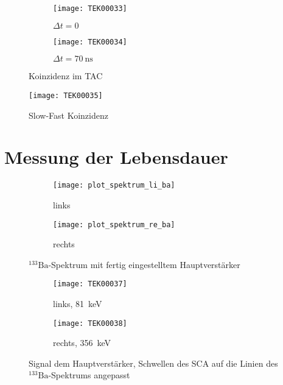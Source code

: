 \documentclass[11pt, ngerman, fleqn, DIV=15, headinclude, BCOR=2cm]{scrreprt}
\begin{document}
\begin{figure}
	\centering
	\begin{subfigure}{0.49 \textwidth}
		\texttt{[image: TEK00033]}
		\caption{%
			$\Delta t = 0$
		}
		\label{fig:fast_signal_tac_koinzidenz-t0}
	\end{subfigure}
	\begin{subfigure}{0.49 \textwidth}
		\texttt{[image: TEK00034]}
		\caption{%
			$\Delta t = \SI{70}{\nano\second}$
		}
		\label{fig:fast_signal_tac_koinzidenz-t5-16}
	\end{subfigure}
	\caption{%
		Koinzidenz im TAC
	}
	\label{fig:fast_signal_tac_koinzidenz}
\end{figure}

\begin{figure}
	\centering
	\texttt{[image: TEK00035]}
	\caption{%
		Slow-Fast Koinzidenz
	}
	\label{fig:slow_fast_koinzidenz}
\end{figure}

\fehlt%

\clearpage

\section{Messung der Lebensdauer}

\begin{figure}
	\centering
	\begin{subfigure}{0.49 \textwidth}
		\texttt{[image: plot\_spektrum\_li\_ba]}
		\caption{%
			links
		}
		\label{fig:ba_slow_hv_eingestellt-li_plot}
	\end{subfigure}
	\begin{subfigure}{0.49 \textwidth}
		\texttt{[image: plot\_spektrum\_re\_ba]}
		\caption{%
			rechts
		}
		\label{fig:ba_slow_hv_eingestellt-re_plot}
	\end{subfigure}
	\caption{%
		$^{133}\text{Ba}$-Spektrum mit fertig eingestelltem
		Hauptverstärker
	}
	\label{fig:ba_slow_signal_hv_eingestellt_plot}
\end{figure}

\begin{figure}
	\centering
	\begin{subfigure}{0.49 \textwidth}
		\texttt{[image: TEK00037]}
		\caption{%
			links, \SI{81}{\kilo\electronvolt}
		}
		\label{fig:ba_slow_signal_sca_eingestellt-li}
	\end{subfigure}
	\begin{subfigure}{0.49 \textwidth}
		\texttt{[image: TEK00038]}
		\caption{%
			rechts, \SI{356}{\kilo\electronvolt}
		}
		\label{fig:ba_slow_signal_sca_eingestellt-re}
	\end{subfigure}
	\caption{%
		Signal dem Hauptverstärker, Schwellen des SCA auf die Linien
		des $^{133}\text{Ba}$-Spektrums angepasst
	}
	\label{fig:ba_slow_signal_sca_eingestellt}
\end{figure}
\end{document}
